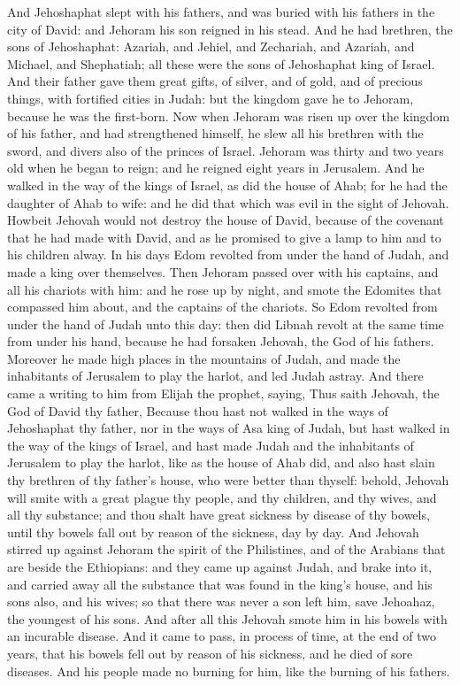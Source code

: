 And Jehoshaphat slept with his fathers, and was buried with his fathers in the city of David: and Jehoram his son reigned in his stead. And he had brethren, the sons of Jehoshaphat: Azariah, and Jehiel, and Zechariah, and Azariah, and Michael, and Shephatiah; all these were the sons of Jehoshaphat king of Israel. And their father gave them great gifts, of silver, and of gold, and of precious things, with fortified cities in Judah: but the kingdom gave he to Jehoram, because he was the first-born. Now when Jehoram was risen up over the kingdom of his father, and had strengthened himself, he slew all his brethren with the sword, and divers also of the princes of Israel. Jehoram was thirty and two years old when he began to reign; and he reigned eight years in Jerusalem. And he walked in the way of the kings of Israel, as did the house of Ahab; for he had the daughter of Ahab to wife: and he did that which was evil in the sight of Jehovah. Howbeit Jehovah would not destroy the house of David, because of the covenant that he had made with David, and as he promised to give a lamp to him and to his children alway.  In his days Edom revolted from under the hand of Judah, and made a king over themselves. Then Jehoram passed over with his captains, and all his chariots with him: and he rose up by night, and smote the Edomites that compassed him about, and the captains of the chariots. So Edom revolted from under the hand of Judah unto this day: then did Libnah revolt at the same time from under his hand, because he had forsaken Jehovah, the God of his fathers.  Moreover he made high places in the mountains of Judah, and made the inhabitants of Jerusalem to play the harlot, and led Judah astray. And there came a writing to him from Elijah the prophet, saying, Thus saith Jehovah, the God of David thy father, Because thou hast not walked in the ways of Jehoshaphat thy father, nor in the ways of Asa king of Judah, but hast walked in the way of the kings of Israel, and hast made Judah and the inhabitants of Jerusalem to play the harlot, like as the house of Ahab did, and also hast slain thy brethren of thy father’s house, who were better than thyself: behold, Jehovah will smite with a great plague thy people, and thy children, and thy wives, and all thy substance; and thou shalt have great sickness by disease of thy bowels, until thy bowels fall out by reason of the sickness, day by day.  And Jehovah stirred up against Jehoram the spirit of the Philistines, and of the Arabians that are beside the Ethiopians: and they came up against Judah, and brake into it, and carried away all the substance that was found in the king’s house, and his sons also, and his wives; so that there was never a son left him, save Jehoahaz, the youngest of his sons.  And after all this Jehovah smote him in his bowels with an incurable disease. And it came to pass, in process of time, at the end of two years, that his bowels fell out by reason of his sickness, and he died of sore diseases. And his people made no burning for him, like the burning of his fathers. 